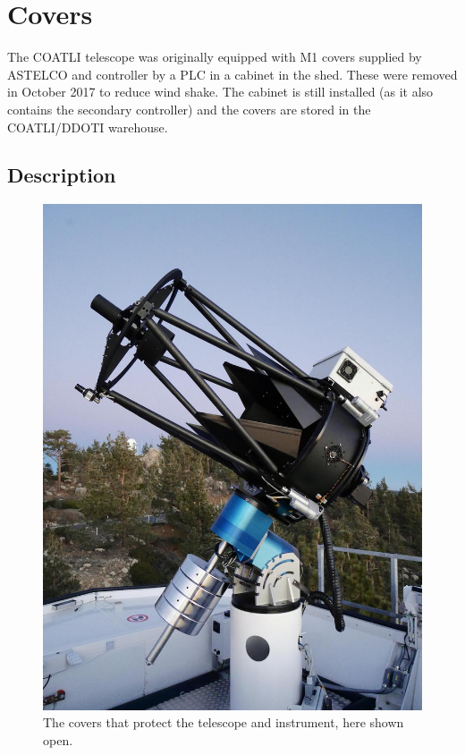 \chapter{Covers}
\label{chapter:covers}

The COATLI telescope was originally equipped with M1 covers supplied by ASTELCO and controller by a PLC in a cabinet in the shed. These were removed in October 2017 to reduce wind shake. The cabinet is still installed (as it also contains the secondary controller) and the covers are stored in the COATLI/DDOTI warehouse.

\section{Description}

\begin{figure}
\begin{center}
\includegraphics[width=0.8\linewidth]{figures/covers-open.jpg}
\end{center}
\caption{The covers that protect the telescope and instrument, here shown open.}
\label{figure:covers-open}
\end{figure}

